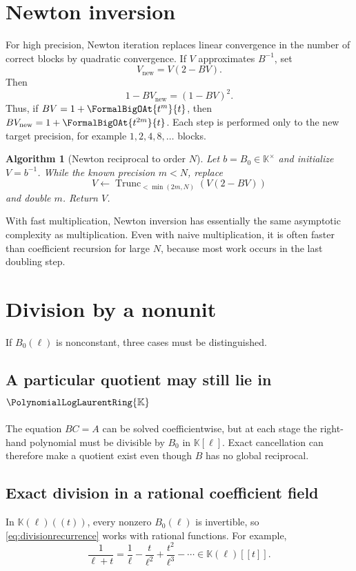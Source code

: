 \documentclass[11pt,oneside,openany]{book}
\newtheorem{algorithm}[theorem]{Algorithm}
\newcommand{\K}{\mathbb{K}}
\newcommand{\Pring}{\PolynomialLogLaurentRing{\K}}
\newcommand{\TransseriesTruncateBelow}[2]{%
  \operatorname{Trunc}_{<#2}\!\left(#1\right)%
}
\begin{document}
\section{Newton inversion}
For high precision, Newton iteration replaces linear convergence in the number
of correct blocks by quadratic convergence.  If \(V\) approximates \(B^{-1}\),
set
\begin{equation}\label{eq:newtonreciprocal}
  V_{\mathrm{new}}=V(2-BV).
\end{equation}
Then
\begin{equation}\label{eq:newtonreciprocalerror}
  1-BV_{\mathrm{new}}=(1-BV)^2.
\end{equation}
Thus, if \(BV=1+\FormalBigOAt{t^m}{t}\), then
\(BV_{\mathrm{new}}=1+\FormalBigOAt{t^{2m}}{t}\).  Each step is performed only to the
new target precision, for example \(1,2,4,8,\ldots\) blocks.

\begin{algorithm}[Newton reciprocal to order \(N\)]
Let \(b=B_0\in\K^\times\) and initialize \(V=b^{-1}\).  While the known
precision \(m<N\), replace
\[
 V\leftarrow\TransseriesTruncateBelow{V(2-BV)}{\min(2m,N)}
\]
and double \(m\).  Return \(V\).
\end{algorithm}

With fast multiplication, Newton inversion has essentially the same asymptotic
complexity as multiplication.  Even with naive multiplication, it is often
faster than coefficient recursion for large \(N\), because most work occurs in
the last doubling step.

\section{Division by a nonunit}
If \(B_0(\ell)\) is nonconstant, three cases must be distinguished.

\subsection{A particular quotient may still lie in \texorpdfstring{\(\Pring\)}{P}}
The equation \(BC=A\) can be solved coefficientwise, but at each stage the
right-hand polynomial must be divisible by \(B_0\) in \(\K[\ell]\).  Exact
cancellation can therefore make a quotient exist even though \(B\) has no
global reciprocal.

\subsection{Exact division in a rational coefficient field}
In \(\K(\ell)((t))\), every nonzero \(B_0(\ell)\) is invertible, so
\cref{eq:divisionrecurrence} works with rational functions.  For example,
\begin{equation}\label{eq:ellplusreciprat}
 \frac{1}{\ell+t}
 =\frac1\ell-\frac{t}{\ell^2}+\frac{t^2}{\ell^3}-\cdots
 \in\K(\ell)[[t]].
\end{equation}
\end{document}
